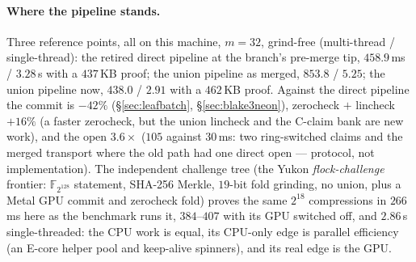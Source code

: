 \documentclass[11pt]{article}
\newcommand{\Fbig}{\mathbb{F}_{2^{128}}}
\begin{document}
\paragraph{Where the pipeline stands.} Three reference points, all on
this machine, $m{=}32$, grind-free (multi-thread / single-thread): the
retired direct pipeline at the branch's pre-merge tip, $458.9\,$ms /
$3.28\,$s with a $437\,$KB proof; the union pipeline as merged,
$853.8$ / $5.25$; the union pipeline now, $438.0$ / $2.91$ with a
$462\,$KB proof. Against the direct pipeline the commit is $-42\%$
(\S\ref{sec:leafbatch}, \S\ref{sec:blake3neon}), zerocheck $+$ lincheck
$+16\%$ (a faster zerocheck, but the union lincheck and the C-claim
bank are new work), and the open $3.6\times$ ($105$ against $30\,$ms:
two ring-switched claims and the merged transport where the old path
had one direct open --- protocol, not implementation). The independent
challenge tree (the Yukon \emph{flock-challenge} frontier: $\Fbig$
statement, SHA-256 Merkle, $19$-bit fold grinding, no union, plus a
Metal GPU commit and zerocheck fold) proves the same $2^{18}$
compressions in $266\,$ms here as the benchmark runs it, $384$--$407$
with its GPU switched off, and $2.86\,$s single-threaded: the CPU work
is equal, its CPU-only edge is parallel efficiency (an E-core helper
pool and keep-alive spinners), and its real edge is the GPU.
\end{document}
